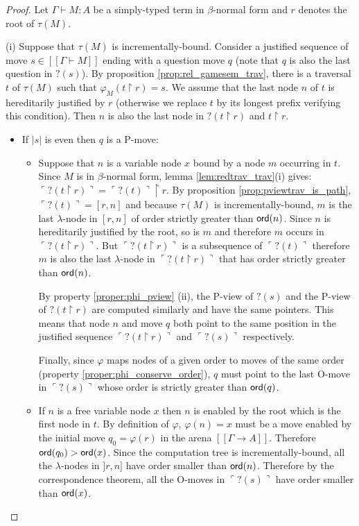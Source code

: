\documentclass{llncs}
\newcommand\ord[1]{{\sf ord}(#1)}
\newcommand{\lsem}{[\![} %
\newcommand{\rsem}{]\!]} %
\newcommand{\sem}[1]{{\lsem #1 \rsem}}
\newcommand{\pview}[1]{\ulcorner #1 \urcorner}
\begin{document}
\begin{proof}
Let $\Gamma \vdash M : A$ be a simply-typed term in $\beta$-normal
form and $r$ denotes the root of $\tau(M)$.

\noindent (i) Suppose that $\tau(M)$ is incrementally-bound.
Consider a justified sequence of move $s \in \sem{\Gamma \vdash M}$
ending with a question move $q$ (note that $q$ is also the last
question in $?(s)$). By proposition \ref{prop:rel_gamesem_trav},
there is a traversal $t$ of $\tau(M)$ such that $\varphi_{M}(t
\upharpoonright r) = s$. We assume that the last node $n$ of $t$ is
hereditarily justified by $r$ (otherwise we replace $t$ by its
longest prefix verifying this condition). Then $n$ is also the last
node in $?(t \upharpoonright r)$ and $t \upharpoonright r$.

\begin{itemize}
\item If $|s|$ is even then $q$ is a P-move:
\begin{itemize}
\item Suppose that $n$ is a variable node $x$ bound by a node $m$ occurring in $t$.
Since $M$ is in $\beta$-normal form, lemma \ref{lem:redtrav_trav}(i)
gives: $ \pview{?(t \upharpoonright r)} = \pview{?(t)}
\upharpoonright  r$. By proposition \ref{prop:pviewtrav_is_path},
$\pview{?(t)} = [r,n]$ and because $\tau(M)$ is incrementally-bound,
$m$ is the last $\lambda$-node in $[r,n]$ of order strictly greater
than $\ord{n}$. Since $n$ is hereditarily justified by the root, so
is $m$ and therefore $m$ occurs in $\pview{?(t \upharpoonright r)}$.
But $\pview{?(t \upharpoonright r)}$ is a subsequence of
$\pview{?(t)}$ therefore $m$ is also the last $\lambda$-node in
$\pview{?(t \upharpoonright  r)}$ that has order strictly greater
than $\ord{n}$.

By property \ref{proper:phi_pview} (ii), the P-view of $?(s)$ and
the P-view of $?(t \upharpoonright r)$ are computed similarly and
have the same pointers. This means that node $n$ and  move $q$ both
point to the same position in the justified sequence
$\pview{?(t\upharpoonright r)}$ and $\pview{?(s)}$ respectively.

Finally, since $\varphi$ maps nodes of a given order to moves of the
same order (property \ref{proper:phi_conserve_order}), $q$ must
point to the last O-move in $\pview{?(s)}$ whose order is strictly
greater than $\ord{q}$.


\item If $n$ is a free variable node $x$ then $n$ is enabled by the root which is the first node in $t$.
By definition of $\varphi$, $\varphi(n) = x$ must be a move enabled
by the initial move $q_0 = \varphi(r)$ in the arena $\sem{\Gamma
\rightarrow A}$. Therefore $\ord{q_0} > \ord{x}$. Since the
computation tree is incrementally-bound, all the $\lambda$-nodes in
$]r,n]$ have order smaller than $\ord{n}$. Therefore by the
correspondence theorem, all the O-moves in $\pview{?(s)}$ have order
smaller than $\ord{x}$.
\end{itemize}




\end{itemize}
\end{proof}
\end{document}
